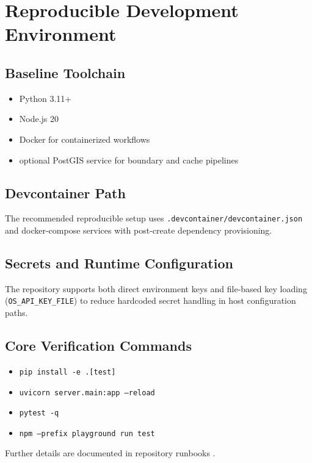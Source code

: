 \chapter{Reproducible Development Environment}
\label{ch:environment}

\section{Baseline Toolchain}

\begin{itemize}
  \item Python 3.11+
  \item Node.js 20
  \item Docker for containerized workflows
  \item optional PostGIS service for boundary and cache pipelines
\end{itemize}

\section{Devcontainer Path}

The recommended reproducible setup uses
\texttt{.devcontainer/devcontainer.json} and docker-compose services with
post-create dependency provisioning.

\section{Secrets and Runtime Configuration}

The repository supports both direct environment keys and file-based key loading
(\texttt{OS\_API\_KEY\_FILE}) to reduce hardcoded secret handling in host
configuration paths.

\section{Core Verification Commands}

\begin{itemize}
  \item \texttt{pip install -e .[test]}
  \item \texttt{uvicorn server.main:app --reload}
  \item \texttt{pytest -q}
  \item \texttt{npm --prefix playground run test}
\end{itemize}

Further details are documented in repository runbooks \cite{readme_main,getting_started,build_doc,tutorial_doc}.
